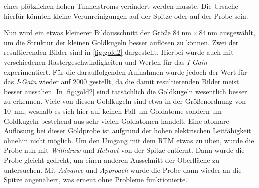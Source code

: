eines plötzlichen hohen Tunnelstroms verändert werden musste. Die Ursache hierfür könnten kleine Verunreinigungen auf der Spitze oder auf der Probe sein.\par
Nun wird ein etwas kleinerer Bildausschnitt der Größe $\SI{84}{\nano \meter} \times \SI{84}{\nano \meter}$ ausgewählt, um die Struktur der kleinen Goldkugeln
besser auflösen zu können. Zwei der resultierenden Bilder sind in \cref{fig:gold2} dargestellt. Hierbei wurde auch mit verschiedenen Rastergeschwindigkeiten
und Werten für das \textit{I-Gain} experimentiert. Für die darauffolgenden Aufnahmen wurde jedoch der Wert für das \textit{I-Gain} wieder auf \num{2000} gestellt, da
die damit resultierenden Bilder meist besser aussahen. In \cref{fig:gold2} sind tatsächlich die Goldkugeln wesentlich besser zu erkennen. Viele von diesen
Goldkugeln sind etwa in der Größenordnung von \SI{10}{\nano \meter}, weshalb es sich hier auf keinen Fall um Goldatome sondern um Goldkugeln bestehend aus sehr
vielen Goldatomen handelt. Eine atomare Auflösung bei dieser Goldprobe ist aufgrund der hohen elektrischen Leitfähigkeit ohnehin nicht möglich. Um den Umgang
mit dem RTM etwas zu üben, wurde die Probe nun mit \textit{Withdraw} und \textit{Retract} von der Spitze entfernt. Dann wurde die Probe gleicht gedreht, um
einen anderen Ausschnitt der Oberfläche zu untersuchen. Mit \textit{Advance} und \textit{Approach} wurde die Probe dann wieder an die Spitze angenähert, was
erneut ohne Probleme funktionierte.
